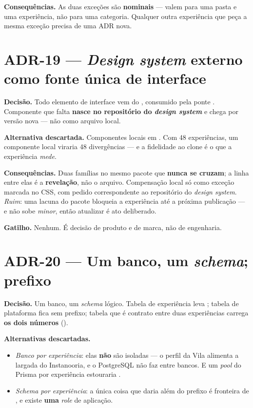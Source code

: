 \textbf{Consequências.} As duas exceções são \textbf{nominais} --- valem para uma
pasta e uma experiência, não para uma categoria. Qualquer outra experiência que
peça a mesma exceção precisa de uma ADR nova.

\section{ADR-19 --- \emph{Design system} externo como fonte única de interface}

\textbf{Decisão.} Todo elemento de interface vem do ,
consumido pela ponte . Componente que falta \textbf{nasce no
repositório do \emph{design system}} e chega por versão nova --- não como arquivo
local.

\textbf{Alternativa descartada.} Componentes locais em . Com 48
experiências, um componente local viraria 48 divergências --- e a fidelidade ao
clone é o que a experiência \emph{mede}.

\textbf{Consequências.} Duas famílias no mesmo pacote que \textbf{nunca se
cruzam}; a linha entre elas é a \textbf{revelação}, não o arquivo. Compensação
local só como exceção marcada no CSS, com pedido correspondente ao repositório do
\emph{design system}. \emph{Ruim}: uma lacuna do pacote bloqueia a experiência até
a próxima publicação --- e  não sobe \emph{minor}, então atualizar é
ato deliberado.

\textbf{Gatilho.} Nenhum. É decisão de produto e de marca, não de engenharia.

\section{ADR-20 --- Um banco, um \emph{schema}; prefixo }

\textbf{Decisão.} Um banco, um \emph{schema} lógico. Tabela de experiência leva
; tabela de plataforma fica sem prefixo; tabela que é contrato entre
duas experiências carrega \textbf{os dois números}
().

\textbf{Alternativas descartadas.}
\begin{itemize}
  \item \emph{Banco por experiência}: elas \textbf{não} são isoladas --- o perfil
    da Vila alimenta a largada do Instanooria, e o PostgreSQL não faz 
    entre bancos. E um \emph{pool} do Prisma por experiência estouraria
    .
  \item \emph{\emph{Schema} por experiência}: a única coisa que daria além do
    prefixo é fronteira de , e existe \textbf{uma} \emph{role} de
    aplicação.
\end{itemize}

